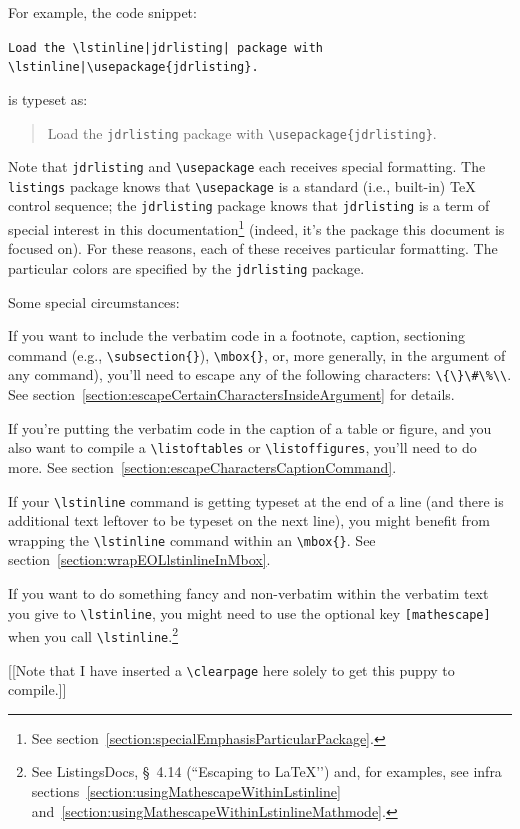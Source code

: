\documentclass[12pt,table,final]{article}%
\DeclareRobustCommand{\escapableCharactersJdrLst}{\lstinline|\{\}\#\%\\|\xspace}
\begin{document}
For example, the code snippet:
\begin{jdrCodeSnip}
\scriptsize
\verb!Load the \lstinline|jdrlisting| package with \lstinline|\usepackage{jdrlisting}.!
\end{jdrCodeSnip}
is typeset as:
\begin{quote}
Load the \lstinline|jdrlisting| package with \lstinline|\usepackage{jdrlisting}|.
\end{quote}
Note that \lstinline|jdrlisting| and \lstinline|\usepackage| each receives special formatting. The \mbox{\lstinline|listings|} package knows that \lstinline|\usepackage| is a standard (i.e., built-in) \TeX{} control sequence; the \lstinline|jdrlisting| package knows that \lstinline|jdrlisting| is a term of special interest in this documentation\footnote{See section~\ref{section:specialEmphasisParticularPackage}.} (indeed, it's the package this document is focused on). For these reasons, each of these receives particular formatting. The particular colors are specified by the \lstinline|jdrlisting| package.

Some special circumstances:
\begin{jdr_itemize}
  \item If you want to include the verbatim code in a footnote, caption, sectioning command (e.g., \lstinline|\subsection{}|), \lstinline|\mbox{}|, or, more generally, in the argument of any command), you'll need to escape any of the following characters: \escapableCharactersJdrLst. See section~\ref{section:escapeCertainCharactersInsideArgument} for details.
  \item If you're putting the verbatim code in the caption of a table or figure, and you also want to compile a \lstinline|\listoftables| or \lstinline|\listoffigures|, you'll need to do more. See section~\ref{section:escapeCharactersCaptionCommand}.
  \item If your \lstinline|\lstinline| command is getting typeset at the end of a line (and there is additional text leftover to be typeset on the next line), you might benefit from wrapping the \lstinline|\lstinline| command within an \lstinline|\mbox{}|. See section~\ref{section:wrapEOLlstinlineInMbox}.
  \item If you want to do something fancy and non-verbatim within the verbatim text you give to \lstinline|\lstinline|, you might need to use the optional key \lstinline|[mathescape]| when you call \lstinline|\lstinline|.\footnote{See ListingsDocs, §~4.14 (``Escaping to \LaTeX’’) and, for examples, see infra sections~\ref{section:usingMathescapeWithinLstinline} and~\ref{section:usingMathescapeWithinLstinlineMathmode}.} 
\end{jdr_itemize}
[[Note that I have inserted a \lstinline|\clearpage| here solely to get this puppy to compile.]]
\clearpage%
\end{document}
